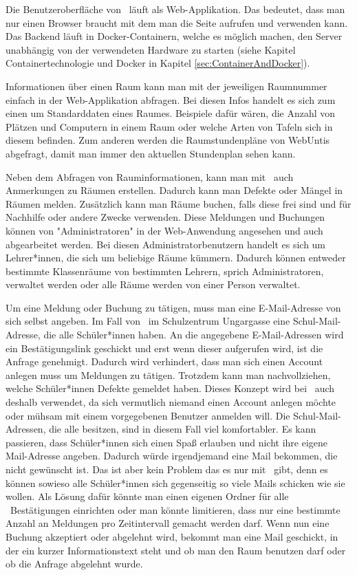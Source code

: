Die Benutzeroberfläche von \ZELIA\ läuft als Web-Applikation. Das bedeutet, dass man nur einen Browser braucht mit dem man die Seite aufrufen und verwenden kann. Das Backend läuft in Docker-Containern, welche es möglich machen, den Server unabhängig von der verwendeten Hardware zu starten (siehe Kapitel Containertechnologie und Docker in Kapitel \ref{sec:ContainerAndDocker}).

Informationen über einen Raum kann man mit der jeweiligen Raumnummer einfach in der Web-Applikation abfragen. Bei diesen Infos handelt es sich zum einen um Standarddaten eines Raumes. Beispiele dafür wären, die Anzahl von Plätzen und Computern in einem Raum oder welche Arten von Tafeln sich in diesem befinden. Zum anderen werden die Raumstundenpläne von WebUntis abgefragt, damit man immer den aktuellen Stundenplan sehen kann.

Neben dem Abfragen von Rauminformationen, kann man mit \ZELIA\ auch Anmerkungen zu Räumen erstellen. Dadurch kann man Defekte oder Mängel in Räumen melden. Zusätzlich kann man Räume buchen, falls diese frei sind und für Nachhilfe oder andere Zwecke verwenden. Diese Meldungen und Buchungen können von "Administratoren" in der Web-Anwendung angesehen und auch abgearbeitet werden. Bei diesen Administratorbenutzern handelt es sich um Lehrer*innen, die sich um beliebige Räume kümmern. Dadurch können entweder bestimmte Klassenräume von bestimmten Lehrern, sprich Administratoren, verwaltet werden oder alle Räume werden von einer Person verwaltet.

Um eine Meldung oder Buchung zu tätigen, muss man eine E-Mail-Adresse von sich selbst angeben. Im Fall von \ZELIA\ im Schulzentrum Ungargasse eine Schul-Mail-Adresse, die alle Schüler*innen haben. An die angegebene E-Mail-Adressen wird ein Bestätigungslink geschickt und erst wenn dieser aufgerufen wird, ist die Anfrage genehmigt. Dadurch wird verhindert, dass man sich einen Account anlegen muss um Meldungen zu tätigen. Trotzdem kann man nachvollziehen, welche Schüler*innen Defekte gemeldet haben. Dieses Konzept wird bei \ZELIA\ auch deshalb verwendet, da sich vermutlich niemand einen Account anlegen möchte oder mühsam mit einem vorgegebenen Benutzer anmelden will. Die Schul-Mail-Adressen, die alle besitzen, sind in diesem Fall viel komfortabler. Es kann passieren, dass Schüler*innen sich einen Spaß erlauben und nicht ihre eigene Mail-Adresse angeben. Dadurch würde irgendjemand eine Mail bekommen, die nicht gewünscht ist. Das ist aber kein Problem das es nur mit \ZELIA\ gibt, denn es können sowieso alle Schüler*innen sich gegenseitig so viele Mails schicken wie sie wollen. Als Lösung dafür könnte man einen eigenen Ordner für alle \ZELIA\ Bestätigungen einrichten oder man könnte limitieren, dass nur eine bestimmte Anzahl an Meldungen pro Zeitintervall gemacht werden darf. Wenn nun eine Buchung akzeptiert oder abgelehnt wird, bekommt man eine Mail geschickt, in der ein kurzer Informationstext steht und ob man den Raum benutzen darf oder ob die Anfrage abgelehnt wurde.

